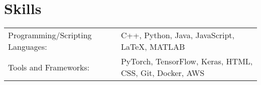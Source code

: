 \documentclass[a4paper,12pt]{article}
\begin{document}
\section{Skills}
\begin{tabularx}{\linewidth}{@{}l X@{}}
Programming/Scripting Languages: &  \normalsize{C++, Python, Java, JavaScript, \LaTeX, MATLAB}\\
Tools and Frameworks: &  \normalsize{PyTorch, TensorFlow, Keras, HTML, CSS, Git, Docker, AWS }\\  
\end{tabularx}


\vfill
{}
\end{document}
